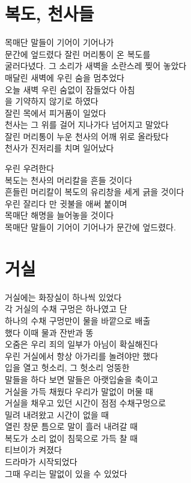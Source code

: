 \begin{article}
\hypertarget{uxbcf5uxb3c4-uxcc9cuxc0acuxb4e4}{%
\chapter{복도, 천사들}\label{uxbcf5uxb3c4-uxcc9cuxc0acuxb4e4}}

목매단 말들이 기어이 기어나가\\
문간에 엎드렸다 잘린 머리통이 온 복도를\\
굴러다녔다. 그 소리가 새벽을 소란스레 찢어 놓았다\\
매달린 새벽에 우린 숨을 멈추었다\\
오늘 새벽 우린 숨없이 잠들었다 아침\\
을 기약하지 않기로 하였다\\
잘린 목에서 피거품이 일었다\\
천사는 그 위를 걸어 지나가다 넘어지고 말았다\\
잘린 머리통이 누운 천사의 어깨 위로 올라탔다\\
천사가 진저리를 치며 일어났다

우린 우려한다\\
복도는 천사의 머리칼을 흔들 것이다\\
흔들린 머리칼이 복도의 유리창을 세게 긁을 것이다\\
우린 잘리다 만 귓불을 애써 붙이며\\
목매단 해명을 늘어놓을 것이다\\
목매단 말들이 기어이 기어나가 문간에 엎드렸다.
\end{article}

\begin{article}
\hypertarget{uxac70uxc2e4}{%
\chapter{거실}\label{uxac70uxc2e4}}

거실에는 화장실이 하나씩 있었다\\
각 거실의 수채 구멍은 하나였고 단\\
하나의 수채 구멍만이 물을 바깥으로 배출\\
했다 이때 물과 잔반과 똥\\
오줌은 우리 죄의 일부가 아님이 확실해진다\\
우린 거실에서 항상 아가리를 놀려야만 했다\\
입을 열고 헛소리, 그 헛소리 엉뚱한\\
말들을 하다 보면 말들은 아랫입술을 축이고\\
거실을 가득 채웠다 우리가 말없이 머물 때\\
거실을 채우고 있던 시간이 점점 수채구멍으로\\
밀려 내려왔고 시간이 없을 때\\
열린 창문 틈으로 말이 흘러 내려갈 때\\
복도가 소리 없이 침묵으로 가득 찰 때\\
티브이가 켜졌다\\
드라마가 시작되었다\\
그때 우리는 말없이 있을 수 있었다
\end{article}

